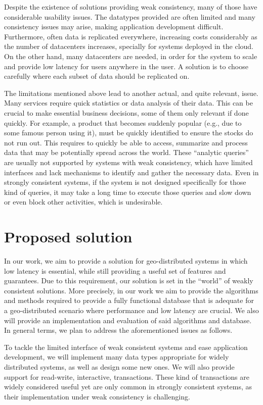 Despite the existence of solutions providing weak consistency, many of those have considerable usability issues.
The datatypes provided are often limited and many consistency issues may arise, making application development difficult.
Furthermore, often data is replicated everywhere, increasing costs considerably as the number of datacenters increases, specially for systems deployed in the cloud.
On the other hand, many datacenters are needed, in order for the system to scale and provide low latency for users anywhere in the user.
A solution is to choose carefully where each subset of data should be replicated on.

The limitations mentioned above lead to another actual, and quite relevant, issue.
Many services require quick statistics or data analysis of their data.
This can be crucial to make essential business decisions, some of them only relevant if done quickly.
For example, a product that becomes suddenly popular (e.g., due to some famous person using it), must be quickly identified to ensure the stocks do not run out.
This requires to quickly be able to access, summarize and process data that may be potentially spread across the world.
These ``analytic queries'' \cite{???} are usually not supported by systems with weak consistency, which have limited interfaces and lack mechanisms to identify and gather the necessary data.
Even in strongly consistent systems, if the system is not designed specifically for those kind of queries, it may take a long time to execute those queries and slow down or even block other activities, which is undesirable.

\section{Proposed solution}

In our work, we aim to provide a solution for geo-distributed systems in which low latency is essential, while still providing a useful set of features and guarantees.
Due to this requirement, our solution is set in the ``world'' of weakly consistent solutions.
More precisely, in our work we aim to provide the algorithms and methods required to provide a fully functional database that is adequate for a geo-distributed scenario where performance and low latency are crucial.
We also will provide an implementation and evaluation of said algorithms and database.
In general terms, we plan to address the aforementioned issues as follows.

To tackle the limited interface of weak consistent systems and ease application development, we will implement many data types appropriate for widely distributed systems, as well as design some new ones.
We will also provide support for read-write, interactive, transactions.
These kind of transactions are widely considered useful yet are only common in strongly consistent systems, as their implementation under weak consistency is challenging.

